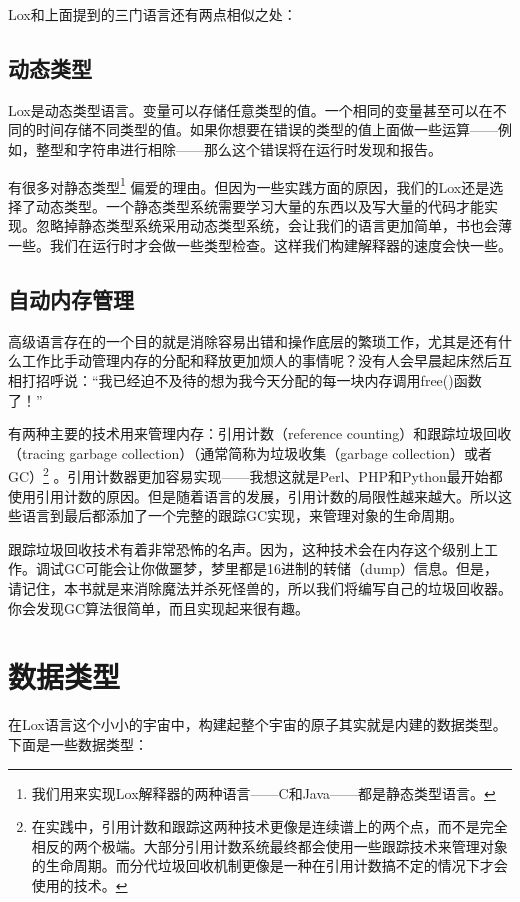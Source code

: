 \documentclass[cn,10pt,math=newtx,citestyle=gb7714-2015,bibstyle=gb7714-2015]{elegantbook}
\begin{document}
Lox和上面提到的三门语言还有两点相似之处：

\subsection{动态类型}

Lox是动态类型语言。变量可以存储任意类型的值。一个相同的变量甚至可以在不同的时间存储不同类型的值。如果你想要在错误的类型的值上面做一些运算——例如，整型和字符串进行相除——那么这个错误将在运行时发现和报告。

有很多对静态类型\footnote{我们用来实现Lox解释器的两种语言——C和Java——都是静态类型语言。} 偏爱的理由。但因为一些实践方面的原因，我们的Lox还是选择了动态类型。一个静态类型系统需要学习大量的东西以及写大量的代码才能实现。忽略掉静态类型系统采用动态类型系统，会让我们的语言更加简单，书也会薄一些。我们在运行时才会做一些类型检查。这样我们构建解释器的速度会快一些。

\subsection{自动内存管理}

高级语言存在的一个目的就是消除容易出错和操作底层的繁琐工作，尤其是还有什么工作比手动管理内存的分配和释放更加烦人的事情呢？没有人会早晨起床然后互相打招呼说：“我已经迫不及待的想为我今天分配的每一块内存调用free()函数了！”

有两种主要的技术用来管理内存：引用计数（reference counting）和跟踪垃圾回收（tracing garbage collection）（通常简称为垃圾收集（garbage collection）或者GC）\footnote{在实践中，引用计数和跟踪这两种技术更像是连续谱上的两个点，而不是完全相反的两个极端。大部分引用计数系统最终都会使用一些跟踪技术来管理对象的生命周期。而分代垃圾回收机制更像是一种在引用计数搞不定的情况下才会使用的技术。} 。引用计数器更加容易实现——我想这就是Perl、PHP和Python最开始都使用引用计数的原因。但是随着语言的发展，引用计数的局限性越来越大。所以这些语言到最后都添加了一个完整的跟踪GC实现，来管理对象的生命周期。

跟踪垃圾回收技术有着非常恐怖的名声。因为，这种技术会在内存这个级别上工作。调试GC可能会让你做噩梦，梦里都是16进制的转储（dump）信息。但是，请记住，本书就是来消除魔法并杀死怪兽的，所以我们将编写自己的垃圾回收器。你会发现GC算法很简单，而且实现起来很有趣。

\section{数据类型}

在Lox语言这个小小的宇宙中，构建起整个宇宙的原子其实就是内建的数据类型。下面是一些数据类型：
\end{document}
